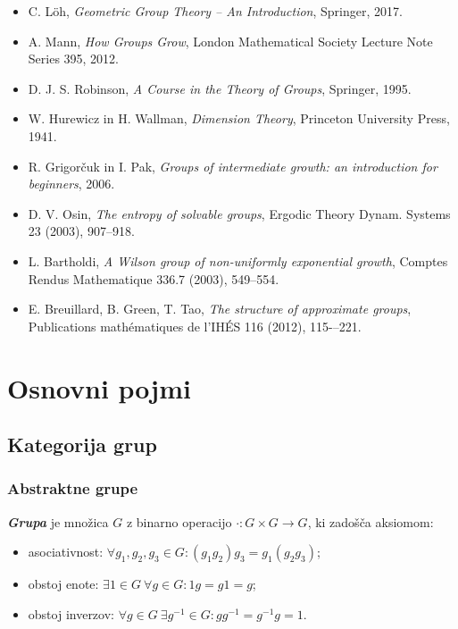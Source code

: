\documentclass[11pt]{book}
\def\definicija{\color{rdeca}\bf\em}
\def\literatura{\color{modra}}
\theoremstyle{definition}
\theoremstyle{zgled}
\theoremstyle{odprtproblem}
\theoremstyle{domacanaloga}
\theoremstyle{izrek}
\begin{document}
\begin{itemize}
\item {\literatura C. Löh, {\em Geometric Group Theory -- An Introduction}, Springer, 2017.} 
\item {\literatura A. Mann, {\em How Groups Grow}, London Mathematical Society Lecture Note Series 395, 2012.}
\item {\literatura D. J. S. Robinson, {\em A Course in the Theory of Groups}, Springer, 1995.}
\item {\literatura W. Hurewicz in H. Wallman, {\em Dimension Theory}, Princeton University Press, 1941.}
\item {\literatura R. Grigorčuk in I. Pak, {\em Groups of intermediate growth: an introduction for beginners}, 2006.}
\item {\literatura D. V. Osin, {\em The entropy of solvable groups}, Ergodic Theory Dynam. Systems 23 (2003), 907--918.}
\item {\literatura L. Bartholdi, {\em A Wilson group of non-uniformly exponential growth}, Comptes Rendus Mathematique 336.7 (2003), 549--554.}
\item {\literatura E. Breuillard, B. Green, T. Tao, {\em The structure of approximate groups}, Publications mathématiques de l'IHÉS 116 (2012), 115-–221.}
\end{itemize}

\chapter{Osnovni pojmi}

\section{Kategorija grup}

\subsection{Abstraktne grupe}

{\definicija Grupa} je množica $G$ z binarno operacijo $\cdot \colon G \times G \to G$, ki zadošča aksiomom:

\begin{itemize}
	\item asociativnost: $\forall g_1, g_2, g_3 \in G \colon (g_1 g_2) g_3 = g_1 (g_2 g_3)$;
	\item obstoj enote: $\exists 1 \in G \ \forall g \in G \colon 1g = g1 = g$;
	\item obstoj inverzov: $\forall g \in G \ \exists g^{-1} \in G \colon g g^{-1} = g^{-1} g = 1$.
\end{itemize}
\end{document}
